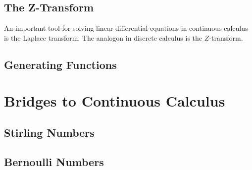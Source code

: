 


\subsection{The Z-Transform}
An important tool for solving linear differential equations in continuous calculus is the Laplace transform. The analogon in discrete calculus is the $Z$-transform. 






\subsection{Generating Functions}



\section{Bridges to Continuous Calculus}

\subsection{Stirling Numbers}




\subsection{Bernoulli Numbers}

